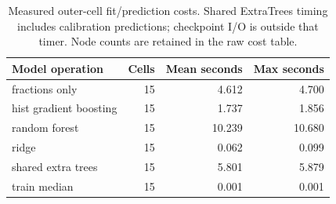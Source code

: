 \begin{table}[htbp]\centering\small
\caption{Measured outer-cell fit/prediction costs. Shared ExtraTrees timing includes calibration predictions; checkpoint I/O is outside that timer. Node counts are retained in the raw cost table.}
\begin{tabular}{lrrr}
\toprule
Model operation & Cells & Mean seconds & Max seconds \\
\midrule
fractions only & 15 & 4.612 & 4.700 \\
hist gradient boosting & 15 & 1.737 & 1.856 \\
random forest & 15 & 10.239 & 10.680 \\
ridge & 15 & 0.062 & 0.099 \\
shared extra trees & 15 & 5.801 & 5.879 \\
train median & 15 & 0.001 & 0.001 \\
\bottomrule
\end{tabular}\end{table}
